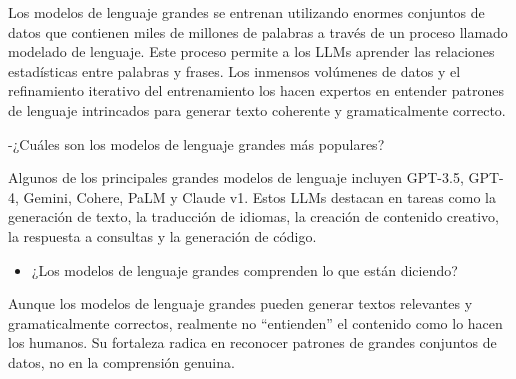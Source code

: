 \documentclass[a4paper12pt]{article}
\providecommand{\tightlist}{%
      \setlength{\itemsep}{0pt}\setlength{\parskip}{0pt}}
\begin{document}
Los modelos de lenguaje grandes se entrenan utilizando enormes conjuntos
de datos que contienen miles de millones de palabras a través de un
proceso llamado modelado de lenguaje. Este proceso permite a los LLMs
aprender las relaciones estadísticas entre palabras y frases. Los
inmensos volúmenes de datos y el refinamiento iterativo del
entrenamiento los hacen expertos en entender patrones de lenguaje
intrincados para generar texto coherente y gramaticalmente correcto.

-¿Cuáles son los modelos de lenguaje grandes más populares?

Algunos de los principales grandes modelos de lenguaje incluyen GPT-3.5,
GPT-4, Gemini, Cohere, PaLM y Claude v1. Estos LLMs destacan en tareas
como la generación de texto, la traducción de idiomas, la creación de
contenido creativo, la respuesta a consultas y la generación de código.

\begin{itemize}
\tightlist
\item
  ¿Los modelos de lenguaje grandes comprenden lo que están diciendo?
\end{itemize}

Aunque los modelos de lenguaje grandes pueden generar textos relevantes
y gramaticalmente correctos, realmente no ``entienden'' el contenido
como lo hacen los humanos. Su fortaleza radica en reconocer patrones de
grandes conjuntos de datos, no en la comprensión genuina.

    
    
    
\end{document}
